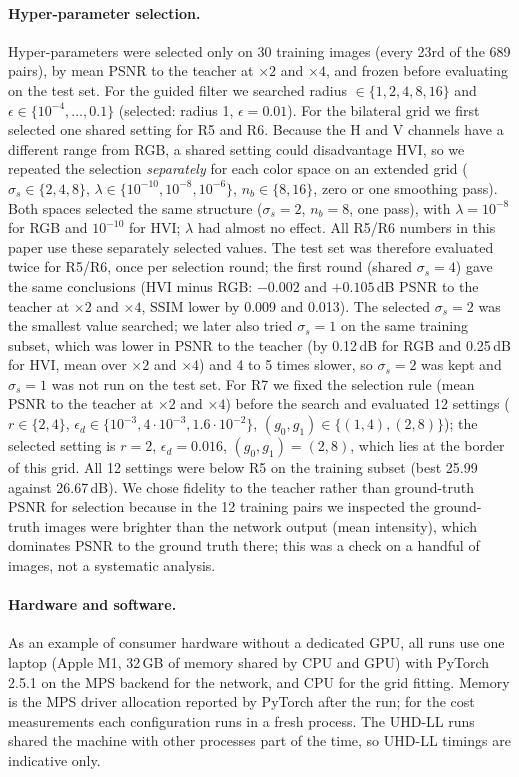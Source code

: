 \documentclass[runningheads]{llncs}
\begin{document}
\paragraph{Hyper-parameter selection.} Hyper-parameters were selected only on 30 training images (every 23rd of the 689 pairs), by mean PSNR to the teacher at $\times2$ and $\times4$, and frozen before evaluating on the test set. For the guided filter we searched radius $\in\{1,2,4,8,16\}$ and $\epsilon\in\{10^{-4},\dots,0.1\}$ (selected: radius 1, $\epsilon=0.01$). For the bilateral grid we first selected one shared setting for R5 and R6. Because the H and V channels have a different range from RGB, a shared setting could disadvantage HVI, so we repeated the selection \emph{separately} for each color space on an extended grid ($\sigma_s\in\{2,4,8\}$, $\lambda\in\{10^{-10},10^{-8},10^{-6}\}$, $n_b\in\{8,16\}$, zero or one smoothing pass). Both spaces selected the same structure ($\sigma_s=2$, $n_b=8$, one pass), with $\lambda=10^{-8}$ for RGB and $10^{-10}$ for HVI; $\lambda$ had almost no effect. All R5/R6 numbers in this paper use these separately selected values. The test set was therefore evaluated twice for R5/R6, once per selection round; the first round (shared $\sigma_s=4$) gave the same conclusions (HVI minus RGB: $-0.002$ and $+0.105$\,dB PSNR to the teacher at $\times2$ and $\times4$, SSIM lower by 0.009 and 0.013). The selected $\sigma_s=2$ was the smallest value searched; we later also tried $\sigma_s=1$ on the same training subset, which was lower in PSNR to the teacher (by 0.12\,dB for RGB and 0.25\,dB for HVI, mean over $\times2$ and $\times4$) and 4 to 5 times slower, so $\sigma_s=2$ was kept and $\sigma_s=1$ was not run on the test set. For R7 we fixed the selection rule (mean PSNR to the teacher at $\times2$ and $\times4$) before the search and evaluated 12 settings ($r\in\{2,4\}$, $\epsilon_d\in\{10^{-3},4\cdot10^{-3},1.6\cdot10^{-2}\}$, $(g_0,g_1)\in\{(1,4),(2,8)\}$); the selected setting is $r=2$, $\epsilon_d=0.016$, $(g_0,g_1)=(2,8)$, which lies at the border of this grid. All 12 settings were below R5 on the training subset (best 25.99 against 26.67\,dB). We chose fidelity to the teacher rather than ground-truth PSNR for selection because in the 12 training pairs we inspected the ground-truth images were brighter than the network output (mean intensity), which dominates PSNR to the ground truth there; this was a check on a handful of images, not a systematic analysis.

\paragraph{Hardware and software.} As an example of consumer hardware without a dedicated GPU, all runs use one laptop (Apple M1, 32\,GB of memory shared by CPU and GPU) with PyTorch~\cite{pytorch} 2.5.1 on the MPS backend for the network, and CPU for the grid fitting. Memory is the MPS driver allocation reported by PyTorch after the run; for the cost measurements each configuration runs in a fresh process. The UHD-LL runs shared the machine with other processes part of the time, so UHD-LL timings are indicative only.
\end{document}
